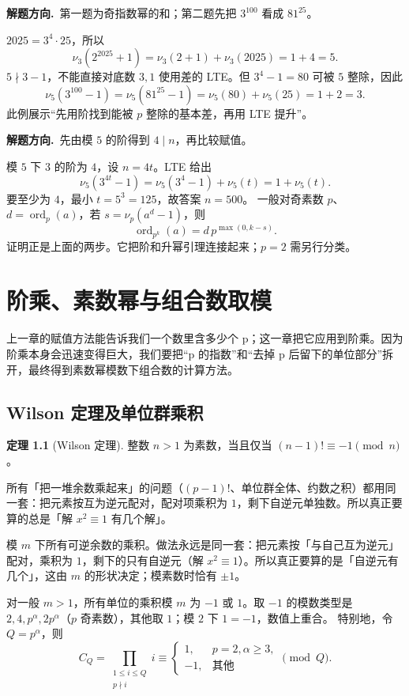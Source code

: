\documentclass[UTF8,a4paper,11pt,twoside,openright,fontset=fandol]{ctexbook}
\theoremstyle{definition}
\newtheorem{theorem}[definition]{定理}
\newcommand{\ord}{\operatorname{ord}}
\newcommand{\hint}{\par\noindent\textbf{解题方向.}\ }
\begin{document}
\hint 第一题为奇指数幂的和；第二题先把 $3^{100}$ 看成 $81^{25}$。

$2025=3^4\cdot25$，所以
\[
\nu_3(2^{2025}+1)=\nu_3(2+1)+\nu_3(2025)=1+4=5.
\]
$5\nmid3-1$，不能直接对底数 $3,1$ 使用差的 LTE。但 $3^4-1=80$ 可被 $5$ 整除，因此
\[
\nu_5(3^{100}-1)=\nu_5(81^{25}-1)=\nu_5(80)+\nu_5(25)=1+2=3.
\]
此例展示“先用阶找到能被 $p$ 整除的基本差，再用 LTE 提升”。


\hint 先由模 $5$ 的阶得到 $4\mid n$，再比较赋值。

模 $5$ 下 $3$ 的阶为 $4$，设 $n=4t$。LTE 给出
\[
 \nu_5(3^{4t}-1)=\nu_5(3^4-1)+\nu_5(t)=1+\nu_5(t).
\]
要至少为 $4$，最小 $t=5^3=125$，故答案 $n=500$。
一般对奇素数 $p$、$d=\ord_p(a)$，若 $s=\nu_p(a^d-1)$，则
\[
 \ord_{p^k}(a)=d\,p^{\max(0,k-s)}.
\]
证明正是上面的两步。它把阶和升幂引理连接起来；$p=2$ 需另行分类。



\chapter{阶乘、素数幂与组合数取模}
\begin{chapterintro}[章节导读]
上一章的赋值方法能告诉我们一个数里含多少个 p；这一章把它应用到阶乘。因为阶乘本身会迅速变得巨大，我们要把“p 的指数”和“去掉 p 后留下的单位部分”拆开，最终得到素数幂模数下组合数的计算方法。
\end{chapterintro}

\section{Wilson 定理及单位群乘积}
\begin{theorem}[Wilson 定理]
整数 $n>1$ 为素数，当且仅当 $(n-1)!\equiv-1\pmod n$。
\end{theorem}
\begin{tip}[一节里其实在算什么乘积]
所有「把一堆余数乘起来」的问题（$(p-1)!$、单位群全体、约数之积）都用同一套：把元素按互为逆元配对，配对项乘积为 $1$，剩下自逆元单独数。所以真正要算的总是「解 $x^2\equiv1$ 有几个解」。
\end{tip}


\begin{tip}
模 $m$ 下所有可逆余数的乘积。做法永远是同一套：把元素按「与自己互为逆元」配对，乘积为 $1$，剩下的只有自逆元（解 $x^2\equiv1$）。所以真正要算的是「自逆元有几个」，这由 $m$ 的形状决定；模素数时恰有 $\pm1$。
\end{tip}

对一般 $m>1$，所有单位的乘积模 $m$ 为 $-1$ 或 $1$。取 $-1$ 的模数类型是 $2,4,p^\alpha,2p^\alpha$（$p$ 奇素数），其他取 $1$；模 $2$ 下 $1=-1$，数值上重合。
特别地，令 $Q=p^\alpha$，则
\[
 C_Q=\prod_{\substack{1\le i\le Q\\p\nmid i}}i\equiv
 \begin{cases}1,&p=2,\alpha\ge3,\\-1,&\text{其他}\end{cases}\pmod Q.
\]
\end{document}
